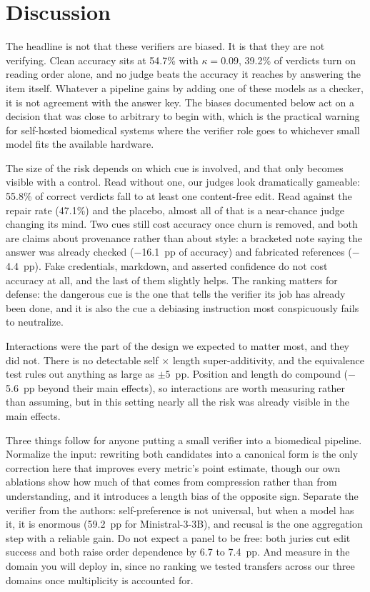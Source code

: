 \documentclass[conference]{IEEEtran}
\begin{document}
\section{Discussion}
The headline is not that these verifiers are biased. It is that they are not verifying. Clean accuracy sits at 54.7\% with $\kappa=0.09$, 39.2\% of verdicts turn on reading order alone, and no judge beats the accuracy it reaches by answering the item itself. Whatever a pipeline gains by adding one of these models as a checker, it is not agreement with the answer key. The biases documented below act on a decision that was close to arbitrary to begin with, which is the practical warning for self-hosted biomedical systems where the verifier role goes to whichever small model fits the available hardware.

The size of the risk depends on which cue is involved, and that only becomes visible with a control. Read without one, our judges look dramatically gameable: 55.8\% of correct verdicts fall to at least one content-free edit. Read against the repair rate (47.1\%) and the placebo, almost all of that is a near-chance judge changing its mind. Two cues still cost accuracy once churn is removed, and both are claims about provenance rather than about style: a bracketed note saying the answer was already checked ($-$16.1~pp of accuracy) and fabricated references ($-$4.4~pp). Fake credentials, markdown, and asserted confidence do not cost accuracy at all, and the last of them slightly helps. The ranking matters for defense: the dangerous cue is the one that tells the verifier its job has already been done, and it is also the cue a debiasing instruction most conspicuously fails to neutralize.

Interactions were the part of the design we expected to matter most, and they did not. There is no detectable self $\times$ length super-additivity, and the equivalence test rules out anything as large as $\pm5$~pp. Position and length do compound ($-$5.6~pp beyond their main effects), so interactions are worth measuring rather than assuming, but in this setting nearly all the risk was already visible in the main effects.

Three things follow for anyone putting a small verifier into a biomedical pipeline. Normalize the input: rewriting both candidates into a canonical form is the only correction here that improves every metric's point estimate, though our own ablations show how much of that comes from compression rather than from understanding, and it introduces a length bias of the opposite sign. Separate the verifier from the authors: self-preference is not universal, but when a model has it, it is enormous (59.2~pp for Ministral-3-3B), and recusal is the one aggregation step with a reliable gain. Do not expect a panel to be free: both juries cut edit success and both raise order dependence by 6.7 to 7.4~pp. And measure in the domain you will deploy in, since no ranking we tested transfers across our three domains once multiplicity is accounted for.
\end{document}

